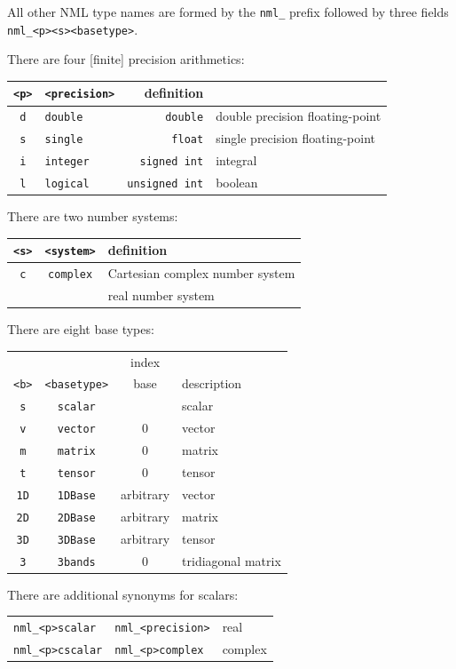 \documentclass[twoside,12pt]{article}
\begin{document}
All other NML type names are formed by the {\tt nml\_} prefix
followed by three fields {\tt nml\_<p><s><basetype>}.

There are four [finite] precision arithmetics:
\begin{center}
\begin{tabular}{c|l|r|l}
{\tt <p>}& {\tt <precision>}&definition&	\\
\hline
{\tt d}&   {\tt double}	&{\tt double}  &double precision floating-point	\\
{\tt s}&   {\tt single}	&{\tt float}   &single precision floating-point	\\
{\tt i}&   {\tt integer}&{\tt   signed int}&integral	\\
{\tt l}&   {\tt logical}&{\tt unsigned int}&boolean
\end{tabular}
\end{center}

There are two number systems:
\begin{center}
\begin{tabular}{c|c|l}
{\tt <s>}	&{\tt <system>}	&definition				\\
\hline
{\tt c}		&{\tt complex}	&Cartesian complex number system	\\
		&		&real number system
\end{tabular}
\end{center}

There are eight base types:
\begin{center}
\begin{tabular}{c|c|c|l}
	&			&index		&			\\
{\tt <b>}&{\tt <basetype>}	&base		&description		\\
\hline
{\tt s}&{\tt scalar}		&		&scalar			\\
{\tt v}&{\tt vector}		&$0$		&vector			\\
{\tt m}&{\tt matrix}		&$0$		&matrix			\\
{\tt t}&{\tt tensor}		&$0$		&tensor			\\
\hline
{\tt 1D}&{\tt 1DBase}		&arbitrary	&vector			\\
{\tt 2D}&{\tt 2DBase}		&arbitrary	&matrix			\\
{\tt 3D}&{\tt 3DBase}		&arbitrary	&tensor			\\
\hline
{\tt 3}&{\tt 3bands}		&$0$		&tridiagonal matrix
\end{tabular}
\end{center}

There are additional synonyms for scalars:
\begin{center}
\begin{tabular}{l|l|l}
\hline
{\tt nml\_<p>scalar}	&{\tt nml\_<precision>}	&real		\\
{\tt nml\_<p>cscalar}	&{\tt nml\_<p>complex}	&complex	\\
\hline
\end{tabular}
\end{center}
\end{document}
